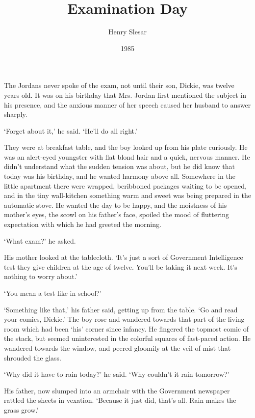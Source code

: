 \documentclass[10pt,a4paper]{article}
\begin{document}
\title{Examination Day}
\date{1985}
\author{Henry Slesar}
\maketitle
    
\thispagestyle{plain}
\setcounter{page}{1}
\linenumbers
\noindent The Jordans never spoke of the exam, not until their son, Dickie, was twelve years old. It was on his birthday that Mrs. Jordan first mentioned the subject in his presence, and the anxious manner of her speech caused her husband to answer sharply.

‘Forget about it,’ he said. ‘He’ll do all right.’

They were at breakfast table, and the boy looked up from his plate curiously. He was an alert-eyed youngster with flat blond hair and a quick, nervous manner. He didn’t understand what the sudden tension was about, but he did know that today was his birthday, and he wanted harmony above all. Somewhere in the little apartment there were wrapped, beribboned packages waiting to be opened, and in the tiny wall-kitchen something warm and sweet was being prepared in the automatic stove. He wanted the day to be happy, and the moistness of his mother’s eyes, the scowl on his father’s face, spoiled the mood of fluttering expectation with which he had greeted the morning.

‘What exam?’ he asked.

His mother looked at the tablecloth. ‘It’s just a sort of Government Intelligence test they give children at the age of twelve. You’ll be taking it next week. It’s nothing to worry about.’

‘You mean a test like in school?’

‘Something like that,’ his father said, getting up from the table. ‘Go and read your comics, Dickie.’ The boy rose and wandered towards that part of the living room which had been ‘his’ corner since infancy. He fingered the topmost comic of the stack, but seemed uninterested in the colorful squares of fast-paced action. He wandered towards the window, and peered gloomily at the veil of mist that shrouded the glass.

‘Why did it have to rain today?’ he said. ‘Why couldn’t it rain tomorrow?’

His father, now slumped into an armchair with the Government newspaper rattled the sheets in vexation. ‘Because it just did, that’s all. Rain makes the grass grow.’
\end{document}
